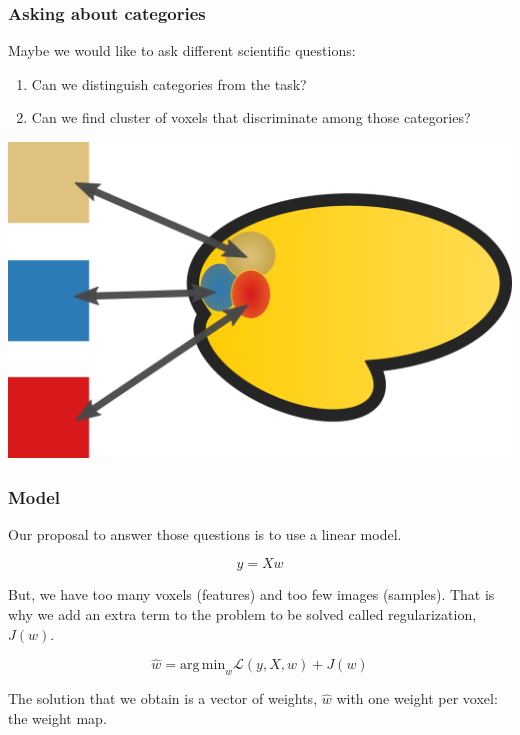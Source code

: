 \documentclass[11pt]{beamer}
\begin{document}
\begin{frame}
    \frametitle{Asking about categories}

    Maybe we would like to ask different scientific questions:
    \begin{enumerate}
        \item Can we distinguish categories from the task?
        \item Can we find cluster of voxels that discriminate among those categories?
    \end{enumerate}

    \begin{center}
        \includegraphics[scale=0.2]{figures/decoding.png}
    \end{center}

\end{frame}

\begin{frame}
    \frametitle{Model}
    Our proposal to answer those questions is to use a linear model. 

    \[y = Xw\]

    But, we have too many voxels (features) and too few images (samples). That
    is why we add an extra term to the problem to be solved called
    regularization, $J(w)$.

    \[\hat{w} = \mathrm{arg\,min}_{w} \mathcal{L}\left(y, X, w \right) + J(w) \]

    The solution that we obtain is a vector of weights, $\hat{w}$ with one
    weight per voxel: the weight map.  

\end{frame}
\end{document}
